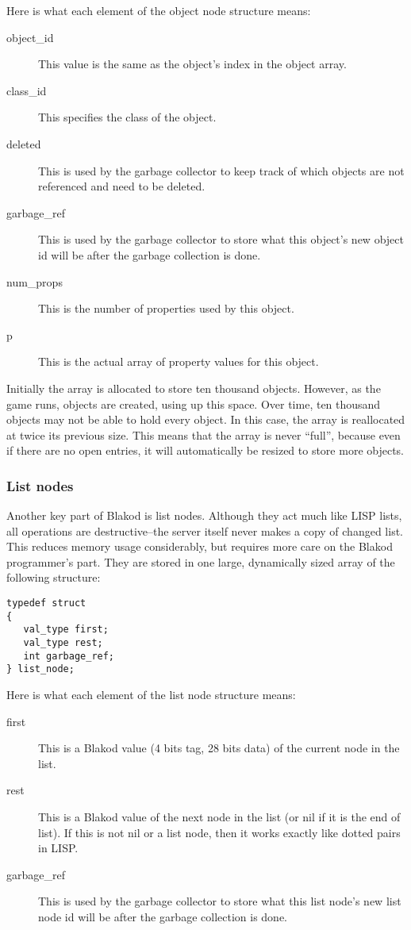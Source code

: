 Here is what each element of the object node structure means:

\begin{description}
\item[object\_id] This value is the same as the object's index in the object array.
\item[class\_id] This specifies the class of the object.
\item[deleted] This is used by the garbage collector to keep track of which
objects are not referenced and need to be deleted.
\item[garbage\_ref] This is used by the garbage collector to store what this object's
new object id will be after the garbage collection is done.
\item[num\_props] This is the number of properties used by this object.
\item[p] This is the actual array of property values for this object.
\end{description}

Initially the array is allocated to store ten thousand objects.  However, as the game
runs, objects are created, using up this space.  Over time, ten thousand objects
may not be able to hold every object.  In this case, the array is reallocated
at twice its previous size.  This means that the array is never ``full'', because
even if there are no open entries, it will automatically be resized to store more
objects.

\subsubsection{List nodes}

Another key part of Blakod is list nodes.  Although they act much like
LISP lists, all operations are destructive--the server itself never
makes a copy of changed list.  This reduces memory usage considerably,
but requires more care on the Blakod programmer's part.  They are stored
in one large, dynamically sized array of the following structure:
\begin{verbatim}
typedef struct
{
   val_type first;
   val_type rest;
   int garbage_ref;
} list_node;
\end{verbatim}

Here is what each element of the list node structure means:

\begin{description}
\item[first] This is a Blakod value (4 bits tag, 28 bits data) of the
current node in the list.
\item[rest] This is a Blakod value of the next node in the list (or nil
if it is the end of list).  If this is not nil or a list node, then
it works exactly like dotted pairs in LISP.
\item[garbage\_ref] This is used by the garbage collector to store what this
list node's new list node id will be after the garbage collection is done.
\end{description}

